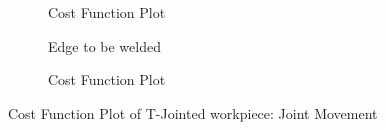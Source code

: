 \begin{figure}[!ht]
\begin{subfigure}[b]{0.4\textwidth}
		\caption{Cost Function Plot}  
		\label{fig:17b}
	\end{subfigure}	
	\begin{subfigure}[b]{0.4\textwidth}
		\caption{Edge to be welded}  
		\label{fig:17c}
	\end{subfigure}
	\begin{subfigure}[b]{0.4\textwidth}
		\caption{Cost Function Plot}  
		\label{fig:17d}
	\end{subfigure}	
	\caption{Cost Function Plot of T-Jointed workpiece: Joint Movement}
	\label{fig:17}
\end{figure}

